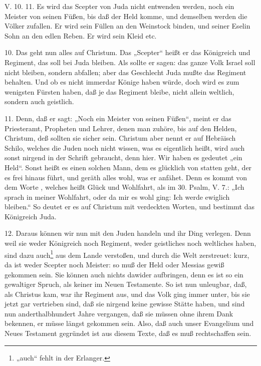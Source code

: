\begin{schriftzitat}
V. 10. 11. Es wird das Scepter von Juda nicht entwenden werden, noch ein Meister von seinen Füßen, bis daß der Held komme, und demselben werden die Völker zufallen. Er wird sein Füllen an den Weinstock binden, und seiner Eselin Sohn an den edlen Reben. Er wird sein Kleid etc.
\end{schriftzitat}

10. Das geht nun alles auf Christum. Das „Scepter“ heißt er das Königreich und Regiment, das soll bei Juda bleiben. Als sollte er sagen: das ganze Volk Israel soll nicht bleiben, sondern abfallen; aber das Geschlecht Juda mußte das Regiment behalten. Und ob es nicht immerdar Könige haben würde, doch wird es zum wenigsten Fürsten haben, daß je das Regiment bleibe, nicht allein weltlich, sondern auch geistlich.

11. Denn, daß er sagt: „Noch ein Meister von seinen Füßen“, meint er das Priesteramt, Propheten und Lehrer, denen man zuhöre, bis auf den Helden, Christum, deß sollten sie sicher sein. Christum aber nennt er auf Hebräisch Schilo, welches die Juden noch nicht wissen, was es eigentlich heißt, wird auch sonst nirgend in der Schrift gebraucht, denn hier. Wir haben es gedeutet „ein Held“. Sonst heißt es einen solchen Mann, dem es glücklich von statten geht, der es frei hinaus führt, und geräth alles wohl, was er anfähet. Denn es kommt von dem Worte , welches heißt Glück und Wohlfahrt, als im 30. Psalm, V. 7.: „Ich sprach in meiner Wohlfahrt, oder da mir es wohl ging: Ich werde ewiglich bleiben.“ So deutet er es auf Christum mit verdeckten Worten, und bestimmt das Königreich Juda.

12. Daraus können wir nun mit den Juden handeln und ihr Ding verlegen. Denn weil sie weder Königreich noch Regiment, weder geistliches noch weltliches haben, sind dazu auch\footnote{„auch“ fehlt in der Erlanger.} aus dem Lande verstoßen, und durch die Welt zerstreuet: kurz, da ist weder Scepter noch Meister: so muß der Held oder Messias gewiß gekommen sein. Sie können auch nichts dawider aufbringen, denn es ist so ein gewaltiger Spruch, als keiner im Neuen Testamente. So ist nun unleugbar, daß, als Christus kam, war ihr Regiment aus, und das Volk ging immer unter, bis sie jetzt gar vertrieben sind, daß sie nirgend keine gewisse Stätte haben, und sind nun anderthalbhundert Jahre vergangen, daß sie müssen ohne ihrem Dank bekennen, er müsse längst gekommen sein. Also, daß auch unser Evangelium und Neues Testament gegründet ist aus diesem Texte, daß es muß rechtschaffen sein.

